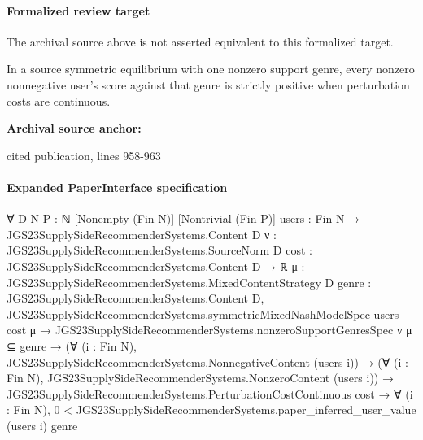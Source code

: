 \documentclass[10pt]{article}
\begin{document}
\paragraph{Formalized review target}
The archival source above is not asserted equivalent to this formalized target.
\begin{ReviewVerbatim}
In a source symmetric equilibrium with one nonzero support genre, every nonzero nonnegative user's score against that genre is strictly positive when perturbation costs are continuous.
\end{ReviewVerbatim}

\textbf{Archival source anchor:} {\footnotesize\raggedright cited publication, lines 958-\allowbreak{}963\par}
\paragraph{Expanded PaperInterface specification}
\begin{ReviewVerbatim}
∀ {D N P : ℕ} [Nonempty (Fin N)] [Nontrivial (Fin P)] {users : Fin N → JGS23SupplySideRecommenderSystems.Content D}
  {ν : JGS23SupplySideRecommenderSystems.SourceNorm D} {cost : JGS23SupplySideRecommenderSystems.Content D → ℝ}
  {μ : JGS23SupplySideRecommenderSystems.MixedContentStrategy D} {genre : JGS23SupplySideRecommenderSystems.Content D},
  JGS23SupplySideRecommenderSystems.symmetricMixedNashModelSpec users cost μ →
    JGS23SupplySideRecommenderSystems.nonzeroSupportGenresSpec ν μ ⊆ {genre} →
      (∀ (i : Fin N), JGS23SupplySideRecommenderSystems.NonnegativeContent (users i)) →
        (∀ (i : Fin N), JGS23SupplySideRecommenderSystems.NonzeroContent (users i)) →
          JGS23SupplySideRecommenderSystems.PerturbationCostContinuous cost →
            ∀ (i : Fin N), 0 < JGS23SupplySideRecommenderSystems.paper_inferred_user_value (users i) genre
\end{ReviewVerbatim}
\end{document}
